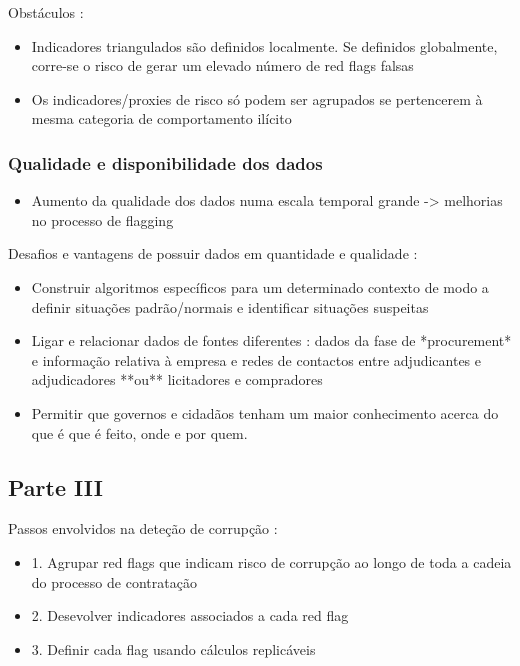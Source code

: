 \documentclass{book}
\begin{document}
Obstáculos : 

\begin{itemize}
	\item Indicadores triangulados são definidos localmente. Se definidos globalmente, corre-se o risco de gerar um elevado número de red flags falsas
	\item Os indicadores/proxies de risco só podem ser agrupados se pertencerem à mesma categoria de comportamento ilícito
\end{itemize}


\subsubsection*{Qualidade e disponibilidade dos dados}

\begin{itemize}
	\item Aumento da qualidade dos dados numa escala temporal grande -> melhorias no processo de flagging
\end{itemize}



Desafios e vantagens de possuir dados em quantidade e qualidade : 

\begin{itemize}
	
	\item Construir algoritmos específicos para um determinado contexto de modo a definir situações padrão/normais e identificar situações suspeitas
	\item Ligar e relacionar dados de fontes diferentes : dados da fase de *procurement* e informação relativa à empresa e redes de contactos entre adjudicantes e adjudicadores **ou** licitadores e compradores 
	\item Permitir que governos e cidadãos tenham um maior conhecimento acerca do que é que é feito, onde e por quem. 
	
\end{itemize}




\subsection*{Parte III}

Passos envolvidos na deteção de corrupção :

\begin{itemize}
	\item 1. Agrupar red flags que indicam risco de corrupção ao longo de toda a cadeia do processo de contratação
	\item 2. Desevolver indicadores associados a cada red flag
	\item 3. Definir cada flag usando cálculos replicáveis
\end{itemize}
\end{document}

